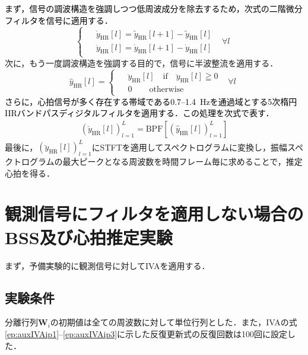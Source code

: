 \documentclass[10.5pt]{jarticle}
\begin{document}
{\textcolor{black}{まず，信号の調波構造を強調しつつ低周波成分を除去するため，次式の二階微分フィルタを信号に適用する．}
\begin{equation} 
    \begin{cases}
        \begin{split}
        & \dot{y}_\mathrm{HR}[l]=\tilde{y}_\mathrm{HR}[l+1]-\tilde{y}_\mathrm{HR}[l] \\
        & \ddot{y}_\mathrm{HR}[l]=\dot{y}_\mathrm{HR}[l+1]-\dot{y}_\mathrm{HR}[l]
        \end{split}                         &   \forall{l}
    \end{cases}
\end{equation}
次に，もう一度調波構造を強調する目的で，信号に半波整流を適用する．
\begin{equation} 
\hat{y}_{\mathrm{HR}}[l] =
    \begin{cases}
        \begin{split}
        & \ddot{y}_\mathrm{HR}[l]\quad \mathrm{if}\quad \ddot{y}_\mathrm{HR}[l]\geqq0 \\
        & 0\hspace{25pt} \mathrm{otherwise}
        \end{split}                         &   \forall{l}
    \end{cases}
\end{equation}
\textcolor{black}{さらに，心拍信号が多く存在する帯域である0.7--1.4~Hzを通過域とする5次楕円IIRバンドパスディジタルフィルタを適用する．この処理を次式で表す．}
\begin{align}
    \left(\breve{y}_{\mathrm{HR}}[l]\right)_{l=1}^{L}=\mathrm{BPF}\left[\left(\hat{y}_{\mathrm{HR}}[l]\right)_{l=1}^{L}\right]
\end{align} \label{eq:bpf}
最後に，$( \breve{y}_{\mathrm{HR}}[l] )_{l=1}^L$にSTFTを適用してスペクトログラムに変換し，振幅スペクトログラムの最大ピークとなる周波数を時間フレーム毎に求めることで，推定心拍を得る．

\section{観測信号にフィルタを適用しない場合のBSS及び心拍推定実験}
\hspace{1.0em}まず，予備実験的に観測信号に対してIVAを適用する．
\subsection{実験条件}
\hspace{1.0em}分離行列$\bm{W}_{i}$の初期値は全ての周波数に対して単位行列とした．また，IVAの式\eqref{ep:auxIVAip1}--\eqref{ep:auxIVAip3}に示した反復更新式の反復回数は100回に設定した．

}
\end{document}
